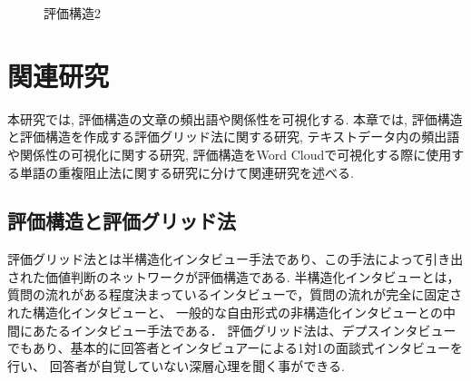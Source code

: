 \documentclass[syuuron]{kuee}
\begin{document}
		\begin{figure}
			\begin{center}
			\end{center}
			\caption{評価構造2}
	  		\label{fig:es3}
		\end{figure}

\chapter{関連研究}
	本研究では, 評価構造の文章の頻出語や関係性を可視化する. 本章では, 評価構造と評価構造を作成する評価グリッド法に関する研究, 
	テキストデータ内の頻出語や関係性の可視化に関する研究, 評価構造をWord Cloudで可視化する際に使用する単語の重複阻止法に関する研究に分けて関連研究を述べる. 
	\section{評価構造と評価グリッド法}
		評価グリッド法とは半構造化インタビュー手法であり、この手法によって引き出された価値判断のネットワークが評価構造である\cite{egm6, egm7}. 
		半構造化インタビューとは，質問の流れがある程度決まっているインタビューで，質問の流れが完全に固定された構造化インタビューと、
		一般的な自由形式の非構造化インタビューとの中間にあたるインタビュー手法である．
		評価グリッド法は、デプスインタビューでもあり、基本的に回答者とインタビュアーによる1対1の面談式インタビューを行い、
		回答者が自覚していない深層心理を聞く事ができる. 
		
\end{document}

